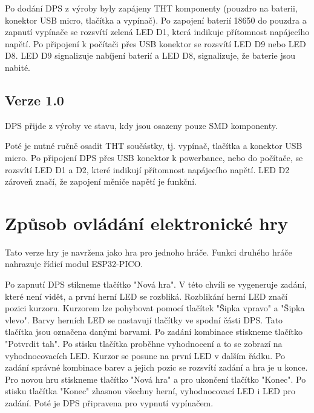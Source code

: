   Po dodání DPS z výroby byly zapájeny THT komponenty (pouzdro na baterii, konektor USB micro, tlačítka a vypínač). Po zapojení baterií
  18650 do pouzdra a zapnutí vypínače se rozsvítí zelená LED D1, která indikuje přítomnost napájecího napětí. Po připojení k počítači 
  přes USB konektor se rozsvítí LED D9 nebo LED D8. LED D9 signalizuje nabíjení baterií a LED D8, signalizuje, že baterie jsou nabité.

  \section{Verze 1.0}
  DPS přijde z výroby ve stavu, kdy jsou osazeny pouze SMD komponenty. %

  Poté je nutné ručně osadit THT součástky, tj. vypínač, tlačítka a konektor USB micro. Po připojení DPS přes USB konektor k powerbance, 
  nebo do počítače, se rozsvítí LED D1 a D2, které indikují přítomnost napájecího napětí. LED D2 zároveň značí, že zapojení měniče
  napětí je funkční.

  \chapter{Způsob ovládání elektronické hry}
  Tato verze hry je navržena jako hra pro jednoho hráče. Funkci druhého hráče nahrazuje řídicí modul ESP32-PICO.

  Po zapnutí DPS stikneme tlačítko "Nová hra". V této chvíli se vygeneruje zadání, které není vidět, a první herní LED se 
  rozbliká. Rozblikání herní LED značí pozici kurzoru. 
  Kurzorem lze pohybovat pomocí tlačítek "Šipka vpravo" a "Šipka vlevo". Barvy herních LED se nastavují tlačítky ve spodní části 
  DPS. Tato tlačítka jsou označena danými barvami.
  Po zadání kombinace stiskneme tlačítko "Potvrdit tah". Po stisku tlačítka proběhne vyhodnocení a to se zobrazí na vyhodnocovacích LED. 
  Kurzor se posune na první LED v dalším řádku.
  Po zadání správné kombinace barev a jejich pozic se rozsvítí zadání a hra je u konce. Pro novou hru stiskneme tlačítko
  "Nová hra" a pro ukončení tlačítko "Konec".
  Po stisku tlačítka "Konec" zhasnou všechny herní, vyhodnocovací LED i LED pro zadání. Poté je DPS připravena pro vypnutí
  vypínačem.





